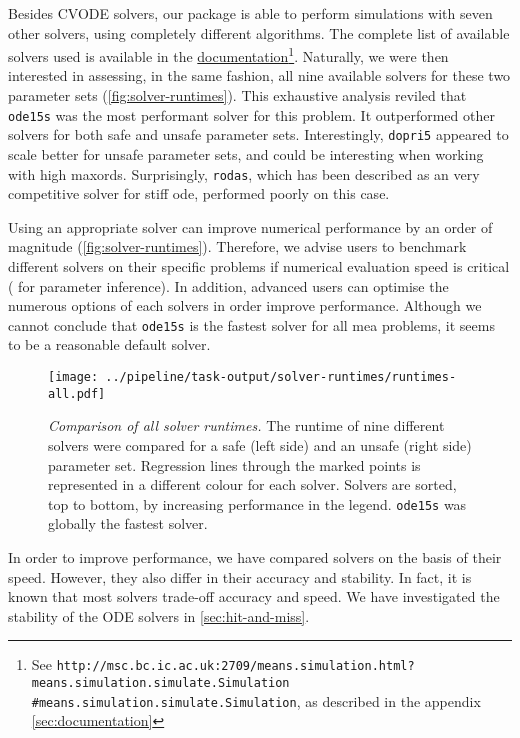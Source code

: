 Besides CVODE solvers, our package is able to perform simulations with seven other solvers, using completely different algorithms.
The complete list of available solvers used is available in the \href{http://msc.bc.ic.ac.uk:2709/means.simulation.html?means.simulation.simulate.Simulation#means.simulation.simulate.Simulation}{documentation}\footnote{See {\tt http://msc.bc.ic.ac.uk:2709/means.simulation.html?means.simulation.simulate.Simulation\\
\#means.simulation.simulate.Simulation}, as described in the appendix \ref{sec:documentation}}.
Naturally, we were then interested in assessing, in the same fashion, all nine available solvers for these two parameter sets (\autoref{fig:solver-runtimes}).
This exhaustive analysis reviled that \texttt{ode15s} was the most performant solver for this problem.
It outperformed other solvers for both safe and unsafe parameter sets.
Interestingly, \texttt{dopri5} appeared to scale better for unsafe parameter sets, and could be interesting when working with high \gls{maxord}s.
Surprisingly, \texttt{rodas}, which has been described as an very competitive solver for stiff \gls{ode}\cite{sandu_benchmarking_1997},
performed poorly on this case.

Using an appropriate solver can improve numerical performance by an order of magnitude (\autoref{fig:solver-runtimes}).
Therefore, we advise users to benchmark different solvers on their specific problems if numerical evaluation speed is critical (\ie{} for parameter inference).
In addition, advanced users can optimise the numerous options of each solvers in order improve performance.
Although we cannot conclude that \texttt{ode15s} is the fastest solver for all \gls{mea} problems,
it seems to be a reasonable default solver.

\begin{figure}[bt]
    \centering
    \texttt{[image: ../pipeline/task-output/solver-runtimes/runtimes-all.pdf]}
    \caption{\emph{Comparison of all solver runtimes.}
    The runtime of nine different solvers were compared for a safe (left side) and an unsafe (right side) parameter set.
    Regression lines through the marked points is represented in a different colour for each solver.
    Solvers are sorted, top to bottom, by increasing performance in the legend.
    \texttt{ode15s} was globally the fastest solver.
    }
    \label{fig:solver-runtimes}
\end{figure}


In order to improve performance, we have compared solvers on the basis of their speed.
However, they also differ in their accuracy and stability. 
In fact, it is known that most solvers trade-off accuracy and speed\cite{sandu_benchmarking_1997}. We have investigated the stability of the ODE solvers in \autoref{sec:hit-and-miss}.

